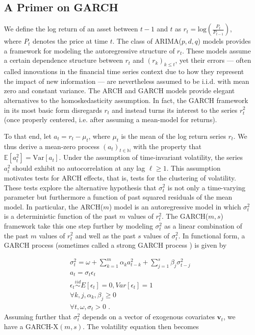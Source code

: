 \documentclass[11pt,3p,review,authoryear]{elsarticle}
\newcommand{\x}{\textbf{v}}
\newcommand{\simiid}{\stackrel{iid}{\sim}} %
\def\mrm#1{\mathrm{#1}} %
\def\E{\mathbb{E}} %
\theoremstyle{definition}
\begin{document}
  \subsection{A Primer on GARCH}
We define the log return of an asset between $t-1$ and $t$ as $r_{t} = \text{log}(\frac{P_{t}}{P_{t-1}})$, where $P_{t}$ denotes the price at time $t$.  The class of ARIMA($p,d,q$) models  \citep{box2013box} provides a framework for modeling the autoregressive structure of $r_{t}$.  These models assume a certain dependence structure between $r_{t}$ and $(r_{k})_{k\leq t}$, yet their errors --- often called innovations in the financial time series context due to how they represent the impact of new information --- are nevertheless assumed to be i.i.d. with mean zero and constant variance.  The ARCH \citep{engle1982autoregressive} and GARCH \citep{bollerslev1986generalized} models provide elegant alternatives to the homoskedasticity assumption.  In fact, the GARCH framework in its most basic form disregards $r_{t}$ and instead turns its interest to the series $r_{t}^{2}$ (once properly centered, i.e. after assuming a mean-model for returns).  

To that end, let $a_{t} = r_{t} - \mu_{t}$, where $\mu_{t}$ is the mean of the log return series $r_{t}$.  We thus derive a mean-zero process $(a_{t})_{t\in\mathbb{N}}$ with the property that $\E[a^{2}_{t}] = \mrm{Var}[a_{t}]$.  Under the assumption of time-invariant volatility, the series $a_{t}^{2}$ should exhibit no autocorrelation at any lag $\ell\geq1$.  This assumption motivates tests for ARCH effects, that is, tests for the clustering of volatility.  These tests explore the alternative hypothesis that $\sigma_{t}^{2}$ is not only a time-varying parameter but furthermore a function of past squared residuals of the mean model.  In particular, the ARCH($m$) model is an autoregressive model in which $\sigma_{t}^{2}$ is a deterministic function of the past $m$ values of $r_{t}^{2}$.  The GARCH($m,s$) framework take this one step further by modeling $\sigma_{t}^{2}$ as a linear combination of the past $m$ values of $r_{t}^{2}$ and well as the past $s$ values of $\sigma_{t}^{2}$.  In functional form, a GARCH process (sometimes called a strong GARCH process \citep[p. 19]{francq2019garch}) is given by

\begin{align*}
&\sigma_{t}^{2} = \omega + \sum^{m}_{k=1}\alpha_{k}a^{2}_{t-k} + \sum_{j=1}^{s}\beta_{j}\sigma_{t-j}^{2}\\
&a_{t} = \sigma_{t}\epsilon_{t}\\
&\epsilon_{t} \simiid E[\epsilon_{t}]=0, Var[\epsilon_{t}] = 1\\
&\forall k,j, \alpha_{k},\beta_{j}\geq 0\\ 
&\forall t, \omega, \sigma_{t} > 0 \text { .} 
\end{align*}
Assuming further that $\sigma^{2}_{t}$ depends on a vector of exogenous covariates $\x_{t}$, we have a  GARCH-X$(m,s)$.  The volatility equation then becomes 
\end{document}
